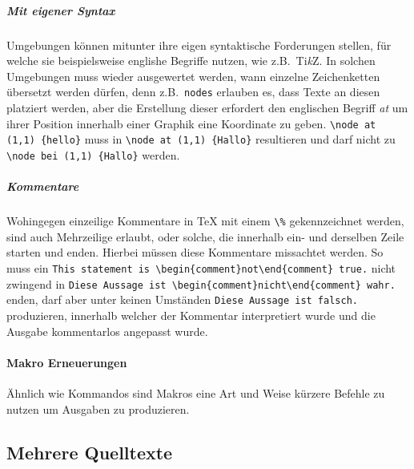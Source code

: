 \subparagraph*{Mit eigener Syntax}\par
Umgebungen können mitunter ihre eigen syntaktische Forderungen stellen, für welche sie beispielsweise englishe Begriffe nutzen, wie z.B.\ Ti\textit{k}Z. In solchen Umgebungen muss wieder ausgewertet werden, wann einzelne Zeichenketten übersetzt werden dürfen, denn z.B.\ \texttt{nodes} erlauben es, dass Texte an diesen platziert werden, aber die Erstellung dieser erfordert den englischen Begriff \textit{at} um ihrer Position innerhalb einer Graphik eine Koordinate zu geben.
\verb|\node at (1,1) {hello}| muss in \verb|\node at (1,1) {Hallo}| resultieren und darf nicht zu \verb|\node bei (1,1) {Hallo}| werden. 

\subparagraph*{Kommentare}\par
Wohingegen einzeilige Kommentare in \TeX{} mit einem \verb"\%" gekennzeichnet werden, sind auch Mehrzeilige erlaubt, oder solche, die innerhalb ein- und derselben Zeile starten und enden. Hierbei müssen diese Kommentare missachtet werden. So muss ein \verb|This statement is \begin{comment}not\end{comment} true.| nicht zwingend in \verb|Diese Aussage ist \begin{comment}nicht\end{comment} wahr.| enden, darf aber unter keinen Umständen \verb|Diese Aussage ist falsch.| produzieren, innerhalb welcher der Kommentar interpretiert wurde und die Ausgabe kommentarlos angepasst wurde.

\paragraph*{Makro Erneuerungen}\par
Ähnlich wie Kommandos sind Makros eine Art und Weise kürzere Befehle zu nutzen um Ausgaben zu produzieren.%


\subsection{Mehrere Quelltexte}
